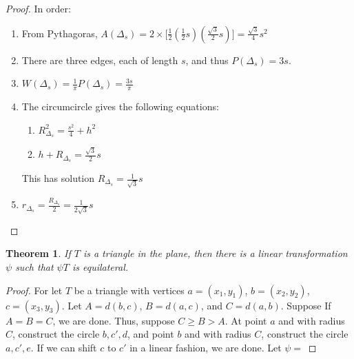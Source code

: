 \documentclass[12pt,oneside]{book}
\theoremstyle{mystyle}
\newtheorem{theorem}{Theorem}[section]
\begin{document}
%
\begin{proof}
In order:
\begin{enumerate}
\item From Pythagoras, $A(\Delta_s) =2\times\big[\frac{1}{2}(\frac{1}{2}s)(\frac{\sqrt{3}}{2}s)\big] = \frac{\sqrt{3}}{4}s^2$
\item There are three edges, each of length $s$, and thus $P(\Delta_s) = 3s$.
\item $W(\Delta_s) = \frac{1}{\pi}P(\Delta_s) = \frac{3s}{\pi}$
\item The circumcircle gives the following equations:
\begin{enumerate}
\item $R_{\Delta_s}^2=\frac{s^2}{4}+h^2$
\item $h+R_{\Delta_s} = \frac{\sqrt{3}}{2}s$
\end{enumerate}
This has solution $R_{\Delta_s}=\frac{1}{\sqrt{3}}s$
\item $r_{\Delta_s} = \frac{R_{\Delta_s}}{2}= \frac{1}{2\sqrt{3}}s$
\end{enumerate}
\end{proof}

\begin{theorem}
If $T$ is a triangle in the plane, then there is a linear transformation $\psi$ such that $\psi T$ is equilateral.
\end{theorem}
\begin{proof}
For let $T$ be a triangle with vertices $a=(x_1,y_1)$, $b=(x_2,y_2)$, $c=(x_3,y_3)$. Let $A = d(b,c)$, $B=d(a,c)$, and $C=d(a,b)$. Suppose If $A=B=C$, we are done. Thus, suppose $C\geq B >A$. At point $a$ and with radius $C$, construct the circle $b,c',d$, and point $b$ and with radius $C$, construct the circle $a,c',e$. If we can shift $c$ to $c'$ in a linear fashion, we are done. Let $\psi =$
\end{proof} 
\end{document}
